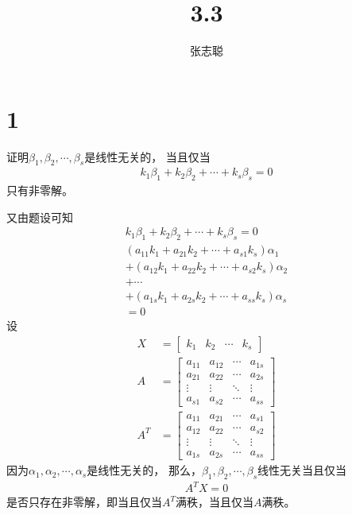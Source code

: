 \documentclass{article}
\begin{document}
\title{3.3}
\author{张志聪}
\maketitle

\section*{1}

证明$\beta_1, \beta_2, \cdots, \beta_s$是线性无关的，
当且仅当
\begin{align*}
  k_1\beta_1 + k_2\beta_2 + \cdots + k_s \beta_s = 0
\end{align*}
只有非零解。

又由题设可知
\begin{align*}
  k_1\beta_1 + k_2\beta_2 + \cdots + k_s \beta_s = 0     \\
  (a_{11} k_1 + a_{21}k_2 + \cdots + a_{s1} k_s)\alpha_1 \\
  +
  (a_{12} k_1 + a_{22}k_2 + \cdots + a_{s2} k_s)\alpha_2 \\
  + \cdots                                               \\
  +
  (a_{1s} k_1 + a_{2s}k_2 + \cdots + a_{ss} k_s)\alpha_s \\
  = 0
\end{align*}
设
\begin{align*}
  X     & = \begin{bmatrix}
              k_1 & k_2 & \cdots & k_s
            \end{bmatrix}          \\
  A     & = \begin{bmatrix}
              a_{11} & a_{12} & \cdots & a_{1s} \\
              a_{21} & a_{22} & \cdots & a_{2s} \\
              \vdots & \vdots & \ddots & \vdots \\
              a_{s1} & a_{s2} & \cdots & a_{ss}
            \end{bmatrix} \\
  A^{T} & = \begin{bmatrix}
              a_{11} & a_{21} & \cdots & a_{s1} \\
              a_{12} & a_{22} & \cdots & a_{s2} \\
              \vdots & \vdots & \ddots & \vdots \\
              a_{1s} & a_{2s} & \cdots & a_{ss}
            \end{bmatrix}
\end{align*}
因为$\alpha_1, \alpha_2, \cdots, \alpha_s$是线性无关的，
那么，$\beta_1, \beta_2, \cdots, \beta_s$线性无关当且仅当
\begin{align*}
  A^T X = 0
\end{align*}
是否只存在非零解，即当且仅当$A^T$满秩，当且仅当$A$满秩。
\end{document}
